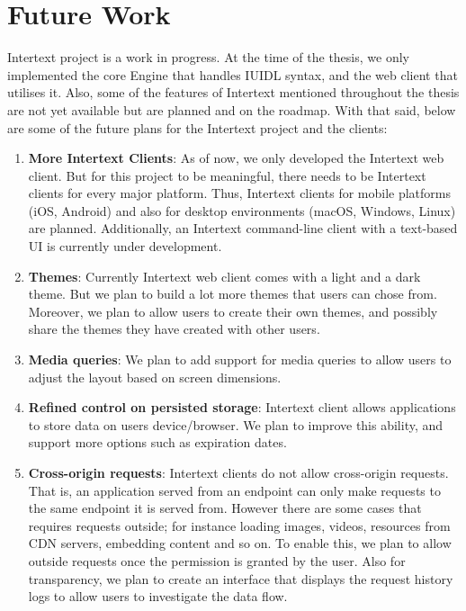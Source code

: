 \section{Future Work} \label{futureWork}

Intertext project is a work in progress. At the time of the thesis, we only implemented the core Engine that handles IUIDL syntax, and the web client that utilises it. Also, some of the features of Intertext mentioned throughout the thesis are not yet available but are planned and on the roadmap. With that said, below are some of the future plans for the Intertext project and the clients:

\begin{enumerate}
    \item \textbf{More Intertext Clients}: As of now, we only developed the Intertext web client. But for this project to be meaningful, there needs to be Intertext clients for every major platform. Thus, Intertext clients for mobile platforms (iOS, Android) and also for desktop environments (macOS, Windows, Linux) are planned. Additionally, an Intertext command-line client with a text-based UI is currently under development.
    
    \item \textbf{Themes}: Currently Intertext web client comes with a light and a dark theme. But we plan to build a lot more themes that users can chose from. Moreover, we plan to allow users to create their own themes, and possibly share the themes they have created with other users.
    
    \item \textbf{Media queries}: We plan to add support for media queries to allow users to adjust the layout based on screen dimensions.
    \item \textbf{Refined control on persisted storage}: Intertext client allows applications to store data on users device/browser. We plan to improve this ability, and support more options such as expiration dates.
    
    \item \textbf{Cross-origin requests}: Intertext clients do not allow cross-origin requests. That is, an application served from an endpoint can only make requests to the same endpoint it is served from. However there are some cases that requires requests outside; for instance loading images, videos, resources from CDN servers, embedding content and so on. To enable this, we plan to allow outside requests once the permission is granted by the user. Also for transparency, we plan to create an interface that displays the request history logs to allow users to investigate the data flow.
    

\end{enumerate}
